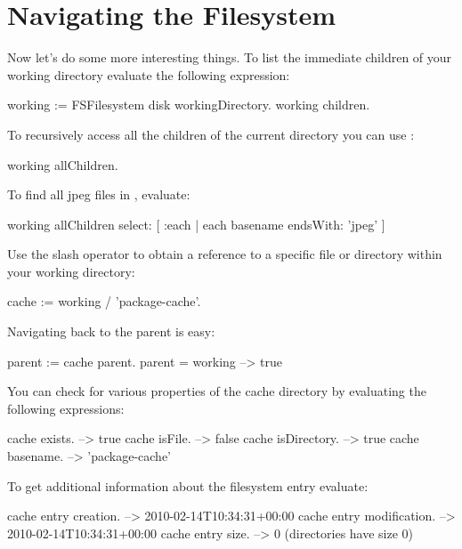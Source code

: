 \documentclass[a4paper,10pt,twoside]{book}
\begin{document}
\section{Navigating the Filesystem}

Now let's do some more interesting things. To list the immediate children of your working directory evaluate the following expression:

\begin{code}{}
working := FSFilesystem disk workingDirectory.
working children.
\end{code} 

To recursively access all the children of the current directory you can use :

\begin{code}{}
working allChildren.
\end{code}


To find all jpeg files in , evaluate:

\begin{code}{}
working allChildren select: [ :each | each basename endsWith: 'jpeg' ]
\end{code} 
 
Use the slash operator to obtain a reference to a specific file or directory within your working directory:

\begin{code}{}
cache := working / 'package-cache'.
\end{code} 

Navigating back to the parent is easy:

\begin{code}{}
parent := cache parent.
parent = working			--> true
\end{code}

You can check for various properties of the cache directory by evaluating the following expressions:

\begin{code}{}
 cache exists.				--> true
 cache isFile.				--> false
 cache isDirectory.			--> true
 cache basename.			--> 'package-cache'
\end{code} 
 
To get additional information about the filesystem entry evaluate:

\begin{code}{}
 cache entry creation.		--> 2010-02-14T10:34:31+00:00
 cache entry modification.	--> 2010-02-14T10:34:31+00:00
 cache entry size.			--> 0 (directories have size 0)
\end{code} 
\end{document}
